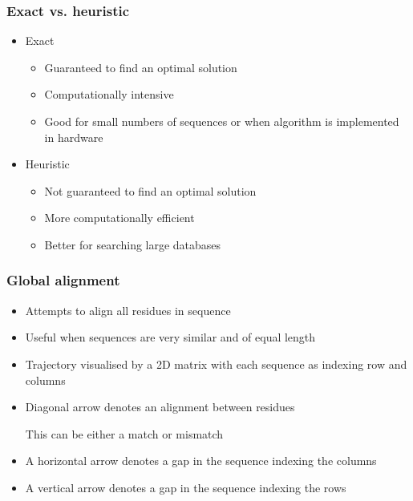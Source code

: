 \documentclass[a4paper]{article}
\begin{document}
\subsubsection{Exact vs. heuristic}

\begin{itemize}
  \item
    Exact

    \begin{itemize}
      \item
        Guaranteed to find an optimal solution

      \item
        Computationally intensive

      \item
        Good for small numbers of sequences or when algorithm is implemented in
        hardware
    \end{itemize}

  \item
    Heuristic

    \begin{itemize}
      \item
        Not guaranteed to find an optimal solution

      \item
        More computationally efficient

      \item
        Better for searching large databases
    \end{itemize}
\end{itemize}

\subsubsection{Global alignment}

\begin{itemize}
  \item
    Attempts to align all residues in sequence

  \item
    Useful when sequences are very similar and of equal length
\end{itemize}


\begin{itemize}
  \item
    Trajectory visualised by a 2D matrix with each sequence as indexing row and
    columns

  \item
    Diagonal arrow denotes an alignment between residues

    This can be either a match or mismatch

  \item
    A horizontal arrow denotes a gap in the sequence indexing the columns

  \item
    A vertical arrow denotes a gap in the sequence indexing the rows
\end{itemize}
\end{document}
